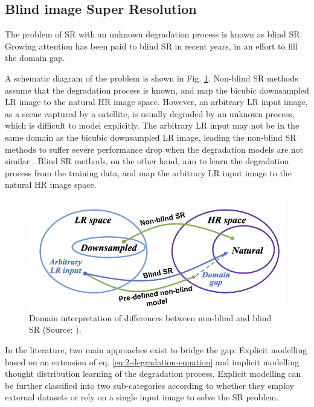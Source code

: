    \subsection{Blind image Super Resolution}

        The problem of SR with an unknown degradation process is known as blind SR. 
        Growing attention has been paid to blind SR in recent years, in an effort to fill the domain gap.
        
        A schematic diagram of the problem is shown in Fig. \ref{fig:2-DomainGap}. 
        Non-blind SR methods assume that the degradation process is known, and map the bicubic downsampled LR image to the natural HR image space.
        However, an arbitrary LR input image, as a scene captured by a satellite, is usually degraded by an unknown process, which is difficult to model explicitly.
        The arbitrary LR input may not be in the same domain as the bicubic downsampled LR image, leading the non-blind SR methods to suffer severe performance drop when the degradation models are not similar \cite{accurateblurs2013}.
        Blind SR methods, on the other hand, aim to learn the degradation process from the training data, and map the arbitrary LR input image to the natural HR image space.
        
        \begin{figure}[H]
            \centering
            \includegraphics[width=\textwidth]{Includes/2-DomainGap.png}
            \caption{Domain interpretation of differences between non-blind and blind SR (Source: \cite{liu2021blind}).}
            \label{fig:2-DomainGap}
        \end{figure}

        In the literature, two main approaches exist to bridge the gap: 
        Explicit modelling based on an extension of eq. \ref{eq:2-degradation-equation} and implicit modelling thought distribution learning of the degradation process.
        Explicit modelling can be further classified into two sub-categories according to whether they employ external datasets or rely on a single input image to solve the SR problem.


